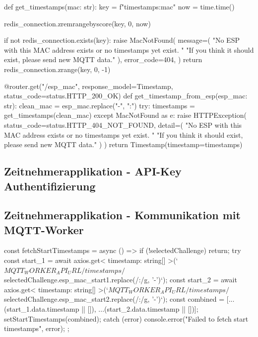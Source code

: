 \begin{CodeBox}
def get_timestamps(mac: str):
    key = f"timestamps:{mac}"
    now = time.time()

    redis_connection.zremrangebyscore(key, 0, now)

    if not redis_connection.exists(key):
        raise MacNotFound(
            message=(
                "No ESP with this MAC address exists or no timestamps yet exist. "
                "If you think it should exist, please send new MQTT data."
            ),
            error_code=404,
        )
    return redis_connection.zrange(key, 0, -1)

@router.get("/{esp_mac}", response_model=Timestamp, status_code=status.HTTP_200_OK)
def get_timestamp_from_esp(esp_mac: str):
    clean_mac = esp_mac.replace("-", ":")
    try:
        timestamps = get_timestamps(clean_mac)
    except MacNotFound as e:
        raise HTTPException(
                status_code=status.HTTP_404_NOT_FOUND,
                detail=(
                    "No ESP with this MAC address exists or no timestamps yet exist. "
                    "If you think it should exist, please send new MQTT data."
                )
            )
    return Timestamp(timestamp=timestamps)
\end{CodeBox}

\newpage

\subsection{Zeitnehmerapplikation - API-Key Authentifizierung}


\newpage

\subsection{Zeitnehmerapplikation - Kommunikation mit MQTT-Worker}

\begin{CodeBox}
const fetchStartTimestamps = async () => {
    if (!selectedChallenge) return;
        try {
        const start_1 = await axios.get<{ timestamp: string[] }>(`${MQTT_WORKER_API_URL}/timestamps/${selectedChallenge.esp_mac_start1.replace(/:/g, '-')}`);
        const start_2 = await axios.get<{ timestamp: string[] }>(`${MQTT_WORKER_API_URL}/timestamps/${selectedChallenge.esp_mac_start2.replace(/:/g, '-')}`);
        const combined = [...(start_1.data.timestamp || []), ...(start_2.data.timestamp || [])];
        setStartTimestamps(combined);
    } catch (error) {
      console.error("Failed to fetch start timestamps", error);
    }
};
\end{CodeBox}

